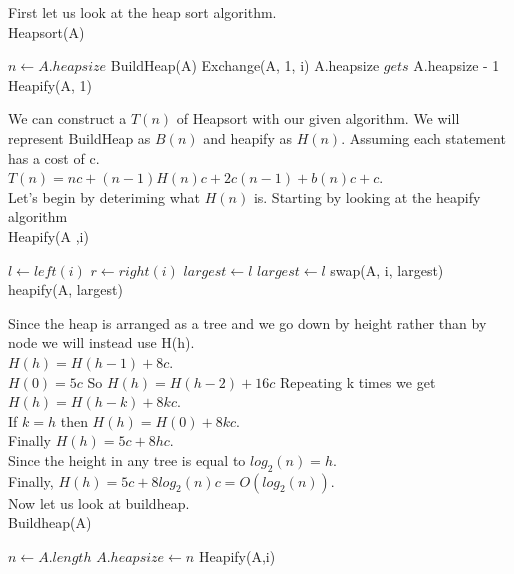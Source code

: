 \documentclass{article}
\begin{document}
First let us look at the heap sort algorithm.\\
Heapsort(A)
\begin{algorithmic}[1]
    \State $n \gets A.heapsize$
    \State BuildHeap(A)
        \State Exchange(A, 1, i)
        \State A.heapsize $gets $ A.heapsize - 1
        \State Heapify(A, 1)
\end{algorithmic}

We can construct a $T(n)$ of Heapsort with our given algorithm.
We will represent BuildHeap as $B(n)$ and heapify as $H(n)$.
Assuming each statement has a cost of c.\\

$T(n) = nc + (n-1)H(n)c + 2c(n - 1) + b(n)c + c$.\\

Let's begin by deteriming what $H(n)$ is. Starting by looking at the 
heapify algorithm\\

Heapify(A ,i)
\begin{algorithmic}[1]
    \State $l \gets left(i)$
    \State $r \gets right(i)$
        \state $largest \gets l$
        \state $largest \gets l$
        \state swap(A, i, largest)
        \state heapify(A, largest)
\end{algorithmic}

Since the heap is arranged as a tree and we go down by height 
rather than by node we will instead use H(h).\\
$H(h) = H(h - 1) + 8c$.\\
$H(0) = 5c$
So $H(h) = H(h - 2) + 16c$
Repeating k times we get $H(h) = H(h - k) + 8kc$.\\
If $k = h$ then $H(h) = H(0) + 8kc$.\\
Finally $H(h) = 5c + 8hc$.\\
Since the height in any tree is equal to $log_{2}(n) = h$.\\
Finally, $H(h) = 5c + 8log_{2}(n)c = O(log_{2}(n))$.\\
Now let us look at buildheap.\\
Buildheap(A)
\begin{algorithmic}[1]
    \State $n \gets A.length$
    \State $A.heapsize \gets n$
        \State Heapify(A,i)
\end{algorithmic}
\end{document}
